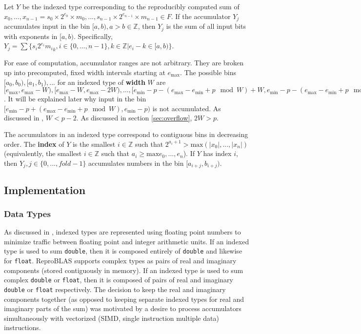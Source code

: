 \documentclass[12pt]{article}
\providecommand{\Z}{\ensuremath{\mathbb{Z}}}
\providecommand{\min}{\ensuremath{\text{min}}}
\providecommand{\max}{\ensuremath{\text{max}}}
\theoremstyle{plain}
\begin{document}
    Let $Y$ be the indexed type corresponding to the reproducibly computed sum of $x_0, ..., x_{n - 1} = s_0 \times 2^{e_0} \times m_0, ..., s_{n - 1} \times 2^{e_{n - 1}} \times m_{n - 1} \in F$.
    If the accumulator $Y_j$ accumulates input in the bin $[a, b), a > b \in \Z$, then $Y_j$ is the sum of all input bits with exponents in $[a, b)$. Specifically, $Y_j = \sum \{s_i2^{e_i}{m_i}_k, i \in \{0, ..., n - 1\}, k \in \Z | e_i - k \in [a, b)\}$.

    For ease of computation, accumulator ranges are not arbitrary. They are broken up into precomputed, fixed width intervals starting at $e_{\max}$. The possible bins $[a_0, b_0), [a_1, b_1), ...$ for an indexed type of \textbf{width} $W$ are $[e_{\max}, e_{\max} - W), [e_{\max} - W, e_{\max} - 2W), ..., [e_{\min} - p - (e_{\max} - e_{\min} + p \mod W) + W, e_{\min} - p - (e_{\max} - e_{\min} + p \mod W))$. It will be explained later why input in the bin $[e_{\min} - p + (e_{\max} - e_{\min} + p \mod W), e_{\min} - p)$ is not accumulated. As discussed in \cite{repsum}, $W < p - 2$. As discussed in section \ref{sec:overflow}, $2W > p$.

    The accumulators in an indexed type correspond to contiguous bins in decreasing order. The \textbf{index} of $Y$ is the smallest $i \in \Z$ such that $2^{a_i + 1} > \max(|x_0|, ..., |x_n|)$ (equivalently, the smallest $i \in \Z$ such that $a_i \geq \max{e_0, ..., e_n}$). If $Y$ has index $i$, then $Y_j, j \in \{0, ..., fold - 1\}$ accumulates numbers in the bin $[a_{i + j}, b_{i + j})$.
  \subsection{Implementation}
    \subsubsection{Data Types}
      As discussed in \cite{repsum}, indexed types are represented using floating point numbers to minimize traffic between floating point and integer arithmetic units. If an indexed type is used to sum \verb|double|, then it is composed entirely of \verb|double| and likewise for \verb|float|. ReproBLAS supports complex types as pairs of real and imaginary components (stored contiguously in memory). If an indexed type is used to sum complex \verb|double| or \verb|float|, then it is composed of pairs of real and imaginary \verb|double| or \verb|float| respectively. The decision to keep the real and imaginary components together (as opposed to keeping separate indexed types for real and imaginary parts of the sum) was motivated by a desire to process accumulators simultaneously with vectorized (SIMD, single instruction multiple data) instructions.
\end{document}
